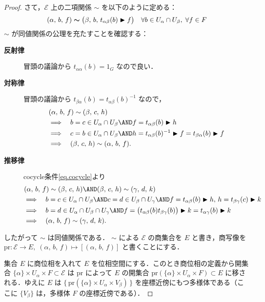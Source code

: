 \documentclass[TQFT_main]{subfiles}
\begin{document}
\begin{proof}
	さて，$\mathcal{E}$ 上の二項関係 $\sim$ を以下のように定める：
	\begin{align}
		\label{eq.prop9-1_equiv}
		(\alpha,\, b,\, f) \bm{\sim} \bigl(\beta,\, b,\, t_{\alpha\beta}(b) \blacktriangleright f\bigr) \quad \forall b \in U_\alpha \cap U_\beta,\; \forall f \in F
	\end{align}
	$\sim$ が同値関係の公理を充たすことを確認する：
	\begin{description}
		\item[\textbf{反射律}] 冒頭の議論から $t_{\alpha\alpha}(b) = 1_G$ なので良い．
		\item[\textbf{対称律}] 冒頭の議論から $t_{\beta\alpha}(b) = t_{\alpha\beta}(b)^{-1}$  なので，
		\begin{align}
			&(\alpha,\, b,\, f) \sim (\beta,\, c,\, h) \\
            &\Longrightarrow \quad b=c \in U_\alpha \cap U_\beta \AND f = t_{\alpha\beta}(b) \btr h \\
			&\Longrightarrow \quad c=b \in U_\alpha \cap U_\beta \AND h = t_{\alpha\beta}(b)^{-1} \btr f = t_{\beta\alpha}(b) \btr f \\
			&\Longrightarrow \quad (\beta,\, c,\, h) \sim (\alpha,\, b,\, f).
		\end{align}
		\item[\textbf{推移律}] cocycle条件\eqref{eq.cocycle}より
		\begin{align}
			&(\alpha,\, b,\, f) \sim (\beta,\, c,\, h) \AND (\beta,\, c,\, h) \sim (\gamma,\, d,\, k) \\
			&\Longrightarrow \quad b=c \in U_\alpha \cap U_\beta \AND c=d \in U_\beta \cap U_\gamma\AND f = t_{\alpha\beta}(b) \btr h,\, h = t_{\beta\gamma}(c) \btr k \\
			&\Longrightarrow \quad b=d \in U_\alpha \cap U_\beta \cap U_\gamma \AND f = \bigl(t_{\alpha\beta}(b) t_{\beta\gamma}(b)\bigr) \btr k = t_{\alpha\gamma}(b)\btr k  \\
			&\Longrightarrow \quad (\alpha,\, b,\, f) \sim (\gamma,\, d,\, k).
		\end{align}
	\end{description}
	したがって $\sim$ は同値関係である．
	$\sim$ による $\mathcal{E}$ の商集合を $E$ と書き，商写像を $\mathrm{pr} \colon \mathcal{E} \to E,\; (\alpha,\, b,\, f)  \mapsto [ (\alpha,\, b,\, f)]$ と書くことにする．

	集合 $E$ に商位相を入れて $E$ を位相空間にする．このとき商位相の定義から開集合 $\{\alpha\} \times U_\alpha \times F \subset \mathcal{E}$ は $\mathrm{pr}$ によって $E$ の開集合 $\mathrm{pr}(\{\alpha\} \times U_\alpha \times F) \subset{E}$ に移される．ゆえに $E$ は $\bigl\{\, \mathrm{pr}(\{\alpha\} \times U_\alpha \times V_\beta)\, \bigr\}$ を座標近傍にもつ\cinfty 多様体である（ここに $\{ V_\beta \}$ は，\cinfty 多様体 $F$ の座標近傍である）．
	

\end{proof}
\end{document}
